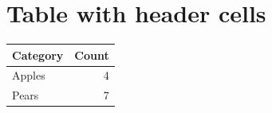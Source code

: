 \documentclass[11pt]{article}
\begin{document}
\section{Table with header cells}
\begin{tabular}{|l|r|}\hline
Category & Count \\\hline
Apples & 4 \\
Pears & 7 \\\hline
\end{tabular}
\end{document}
